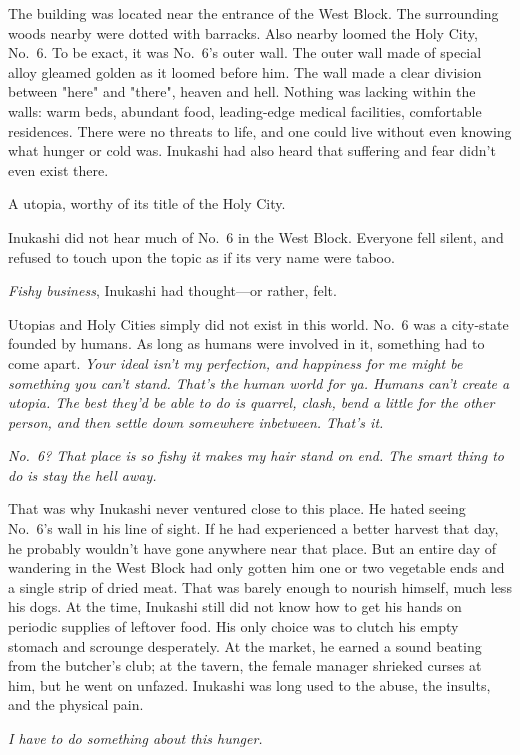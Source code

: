 The building was located near the entrance of the West Block. The
surrounding woods nearby were dotted with barracks. Also nearby loomed
the Holy City, No.~6. To be exact, it was No.~6's outer wall. The outer
wall made of special alloy gleamed golden as it loomed before him. The
wall made a clear division between "here" and "there", heaven and hell.
Nothing was lacking within the walls: warm beds, abundant food,
leading-edge medical facilities, comfortable residences. There were no
threats to life, and one could live without even knowing what hunger or
cold was. Inukashi had also heard that suffering and fear didn't even
exist there.

A utopia, worthy of its title of the Holy City.

Inukashi did not hear much of No.~6 in the West Block. Everyone fell
silent, and refused to touch upon the topic as if its very name were
taboo.

\emph{Fishy business}, Inukashi had thought---or rather, felt.

Utopias and Holy Cities simply did not exist in this world. No.~6 was a
city-state founded by humans. As long as humans were involved in it,
something had to come apart. \emph{Your ideal isn't my perfection, and
happiness for me might be something you can't stand. That's the human
world for ya. Humans can't create a utopia. The best they'd be able to
do is quarrel, clash, bend a little for the other person, and then
settle down somewhere inbetween. That's it.}

\emph{No.~6? That place is so fishy it makes my hair stand on end. The smart
thing to do is stay the hell away.}

That was why Inukashi never ventured close to this place. He hated
seeing No.~6's wall in his line of sight. If he had experienced a better
harvest that day, he probably wouldn't have gone anywhere near that
place. But an entire day of wandering in the West Block had only gotten
him one or two vegetable ends and a single strip of dried meat. That was
barely enough to nourish himself, much less his dogs. At the time,
Inukashi still did not know how to get his hands on periodic supplies of
leftover food. His only choice was to clutch his empty stomach and
scrounge desperately. At the market, he earned a sound beating from the
butcher's club; at the tavern, the female manager shrieked curses at
him, but he went on unfazed. Inukashi was long used to the abuse, the
insults, and the physical pain.

\emph{I have to do something about this hunger.}

